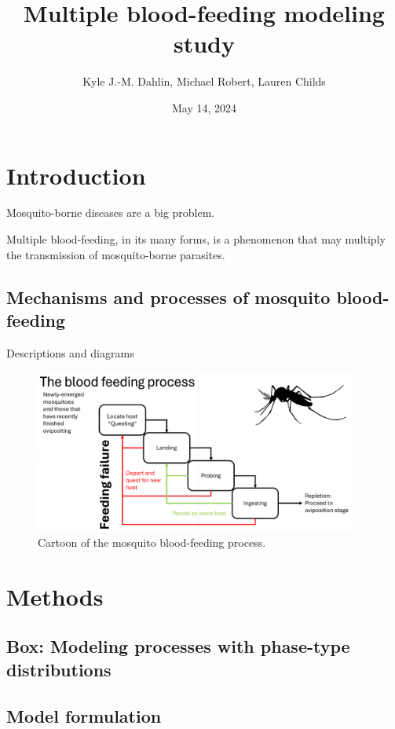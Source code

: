 \documentclass[
]{article}
\title{Multiple blood-feeding modeling study}
\author{Kyle J.-M. Dahlin, Michael Robert, Lauren Childs}
\date{May 14, 2024}
\begin{document}
\maketitle

\section{Introduction}\label{introduction}

Mosquito-borne diseases are a big problem.

Multiple blood-feeding, in its many forms, is a phenomenon that may
multiply the transmission of mosquito-borne parasites.

\subsection{Mechanisms and processes of mosquito
blood-feeding}\label{mechanisms-and-processes-of-mosquito-blood-feeding}

Descriptions and diagrams

\begin{figure}[H]
\includegraphics[width=400px,]{./figures/process_cartoon_draft} \caption{Cartoon of the mosquito blood-feeding process.}\label{fig:figure-1}
\end{figure}

\section{Methods}\label{methods}

\subsection{Box: Modeling processes with phase-type
distributions}\label{box-modeling-processes-with-phase-type-distributions}

\subsection{Model formulation}\label{model-formulation}
\end{document}
